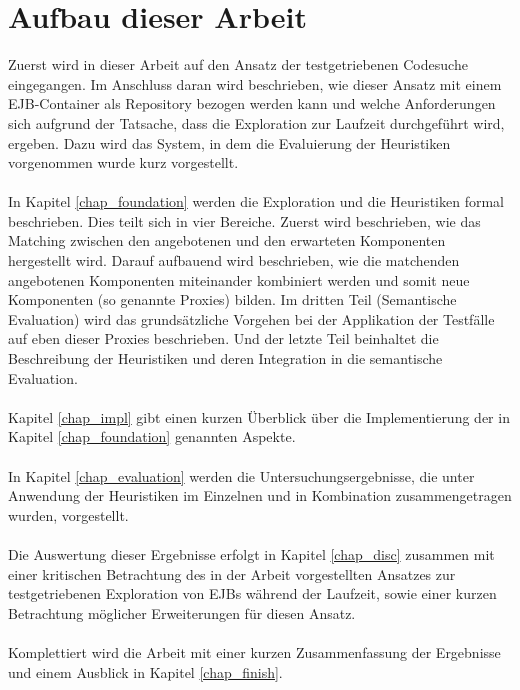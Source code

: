 \section{Aufbau dieser Arbeit}
Zuerst wird in dieser Arbeit auf den Ansatz der testgetriebenen Codesuche eingegangen. Im Anschluss daran wird beschrieben, wie dieser Ansatz mit einem EJB-Container als Repository bezogen werden kann und welche Anforderungen sich aufgrund der Tatsache, dass die Exploration zur Laufzeit durchgeführt wird, ergeben. Dazu wird das System, in dem die Evaluierung der Heuristiken vorgenommen wurde kurz vorgestellt.
\\\\
In Kapitel \ref{chap_foundation} werden die Exploration und die Heuristiken formal beschrieben. Dies teilt sich in vier Bereiche. Zuerst wird beschrieben, wie das Matching zwischen den angebotenen und den erwarteten Komponenten  hergestellt wird. Darauf aufbauend wird beschrieben, wie die matchenden angebotenen Komponenten miteinander kombiniert werden und somit neue Komponenten (so genannte Proxies) bilden. Im dritten Teil (Semantische Evaluation) wird das grundsätzliche Vorgehen bei der Applikation der Testfälle auf eben dieser Proxies beschrieben. Und der letzte Teil beinhaltet die Beschreibung der Heuristiken und deren Integration in die semantische Evaluation.
\\\\
Kapitel \ref{chap_impl} gibt einen kurzen Überblick über die Implementierung der in Kapitel \ref{chap_foundation} genannten Aspekte.
\\\\
In Kapitel \ref{chap_evaluation} werden die Untersuchungsergebnisse, die unter Anwendung der Heuristiken im Einzelnen und in Kombination zusammengetragen wurden, vorgestellt. 
\\\\
Die Auswertung dieser Ergebnisse erfolgt in Kapitel \ref{chap_disc} zusammen mit einer kritischen Betrachtung des in der Arbeit vorgestellten Ansatzes zur testgetriebenen Exploration von EJBs während der Laufzeit, sowie einer kurzen Betrachtung möglicher Erweiterungen für diesen Ansatz.
\\\\
Komplettiert wird die Arbeit mit einer kurzen Zusammenfassung der Ergebnisse und einem Ausblick in Kapitel \ref{chap_finish}.
%